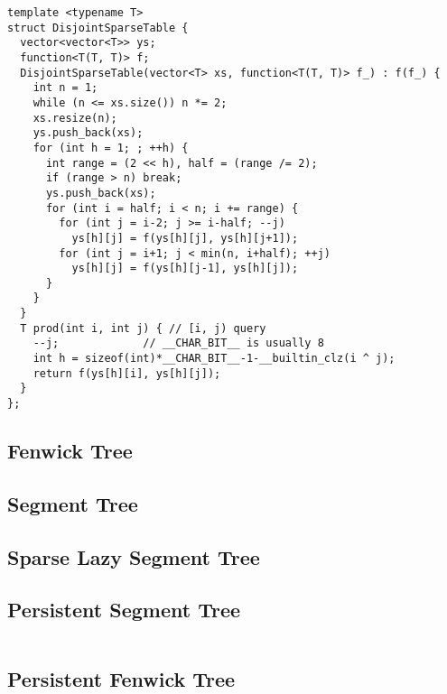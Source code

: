\begin{lstlisting}
template <typename T>
struct DisjointSparseTable {
  vector<vector<T>> ys;
  function<T(T, T)> f;
  DisjointSparseTable(vector<T> xs, function<T(T, T)> f_) : f(f_) {
    int n = 1;
    while (n <= xs.size()) n *= 2;
    xs.resize(n);
    ys.push_back(xs);
    for (int h = 1; ; ++h) {
      int range = (2 << h), half = (range /= 2);
      if (range > n) break;
      ys.push_back(xs);
      for (int i = half; i < n; i += range) {
        for (int j = i-2; j >= i-half; --j) 
          ys[h][j] = f(ys[h][j], ys[h][j+1]);
        for (int j = i+1; j < min(n, i+half); ++j) 
          ys[h][j] = f(ys[h][j-1], ys[h][j]);
      }
    }
  }
  T prod(int i, int j) { // [i, j) query
    --j;             // __CHAR_BIT__ is usually 8
    int h = sizeof(int)*__CHAR_BIT__-1-__builtin_clz(i ^ j);
    return f(ys[h][i], ys[h][j]);
  }
};
\end{lstlisting}

\subsection{Fenwick Tree}
\subsection{Segment Tree}
\subsection{Sparse Lazy Segment Tree}
\subsection{Persistent Segment Tree}

\hrulefill
\begin{multicols}{2}
\inputminted[autogobble,fontsize=\footnotesize]{C++}{Data Structures/persistant_segtree.cpp}
\end{multicols}
\hrulefill

\newpage

\subsection{Persistent Fenwick Tree}

